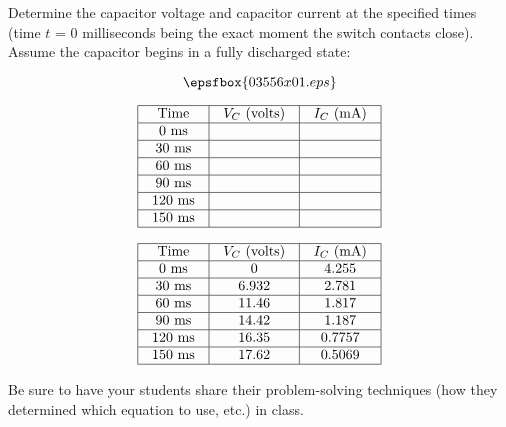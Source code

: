 

Determine the capacitor voltage and capacitor current at the specified times (time $t$ = 0 milliseconds being the exact moment the switch contacts close).  Assume the capacitor begins in a fully discharged state:

$$\epsfbox{03556x01.eps}$$


$$\vbox{\offinterlineskip
\halign{\strut
\vrule \quad\hfil # \ \hfil & 
\vrule \quad\hfil # \ \hfil & 
\vrule \quad\hfil # \ \hfil \vrule \cr
\noalign{\hrule}
%
Time & $V_C$ (volts) & $I_C$ (mA) \cr
%
\noalign{\hrule}
%
0 ms &  &  \cr
%
\noalign{\hrule}
%
30 ms &  &  \cr
%
\noalign{\hrule}
%
60 ms &  &  \cr
%
\noalign{\hrule}
%
90 ms &  &  \cr
%
\noalign{\hrule}
%
120 ms &  &  \cr
%
\noalign{\hrule}
%
150 ms &  &  \cr
%
\noalign{\hrule}
} %
}$$ %








$$\vbox{\offinterlineskip
\halign{\strut
\vrule \quad\hfil # \ \hfil & 
\vrule \quad\hfil # \ \hfil & 
\vrule \quad\hfil # \ \hfil \vrule \cr
\noalign{\hrule}
%
Time & $V_C$ (volts) & $I_C$ (mA) \cr
%
\noalign{\hrule}
%
0 ms & 0 & 4.255 \cr
%
\noalign{\hrule}
%
30 ms & 6.932 & 2.781 \cr
%
\noalign{\hrule}
%
60 ms & 11.46 & 1.817 \cr
%
\noalign{\hrule}
%
90 ms & 14.42 & 1.187 \cr
%
\noalign{\hrule}
%
120 ms & 16.35 & 0.7757 \cr
%
\noalign{\hrule}
%
150 ms & 17.62 & 0.5069 \cr
%
\noalign{\hrule}
} %
}$$ %







Be sure to have your students share their problem-solving techniques (how they determined which equation to use, etc.) in class.




